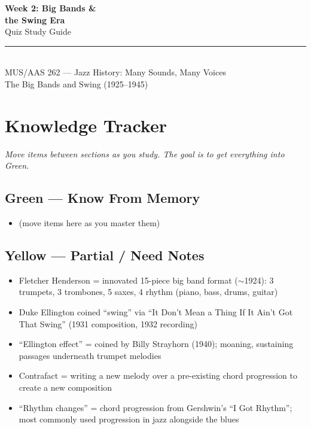 \documentclass[11pt, letterpaper]{article}
\begin{document}
\thispagestyle{empty}
\begin{center}
    \vspace*{0.5cm}
    {\Huge\bfseries\color{accent} Week 2: Big Bands \&\\[0.3em] the Swing Era}\\[0.5em]
    {\Large\color{subaccent} Quiz Study Guide}\\[1em]
    \textcolor{rulecolor}{\rule{0.6\textwidth}{0.8pt}}\\[0.8em]
    {\color{gray}\small MUS/AAS 262 --- Jazz History: Many Sounds, Many Voices\\[0.3em]
    The Big Bands and Swing (1925--1945)}
    \vspace{1cm}
\end{center}

\tableofcontents
\newpage

\section{Knowledge Tracker}

\textit{Move items between sections as you study. The goal is to get everything into Green.}

\subsection*{\textcolor{greenzone}{Green --- Know From Memory}}
\begin{itemize}[label=$\square$]
    \item (move items here as you master them)
\end{itemize}

\subsection*{\textcolor{yellowzone}{Yellow --- Partial / Need Notes}}
\begin{itemize}[label=$\square$]
    \item Fletcher Henderson = innovated 15-piece big band format ($\sim$1924): 3 trumpets, 3 trombones, 5 saxes, 4 rhythm (piano, bass, drums, guitar)
    \item Duke Ellington coined ``swing'' via ``It Don't Mean a Thing If It Ain't Got That Swing'' (1931 composition, 1932 recording)
    \item ``Ellington effect'' = coined by Billy Strayhorn (1940); moaning, sustaining passages underneath trumpet melodies
    \item Contrafact = writing a new melody over a pre-existing chord progression to create a new composition
    \item ``Rhythm changes'' = chord progression from Gershwin's ``I Got Rhythm''; most commonly used progression in jazz alongside the blues
\end{itemize}
\end{document}
